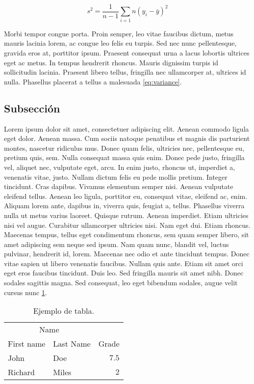 \documentclass[10pt]{article}
\begin{document}
\begin{equation}
   s^2 = \frac{1}{n-1}\sum_{i=1}{n}{(y_i-\bar{y})^2}
   \label{eq:variance}
\end{equation}

Morbi tempor congue porta. Proin semper, leo vitae faucibus dictum, metus mauris lacinia lorem, ac congue leo felis eu turpis. Sed nec nunc pellentesque, gravida eros at, porttitor ipsum. Praesent consequat urna a lacus lobortis ultrices eget ac metus. In tempus hendrerit rhoncus. Mauris dignissim turpis id sollicitudin lacinia. Praesent libero tellus, fringilla nec ullamcorper at, ultrices id nulla. Phasellus placerat a tellus a malesuada \ref{eq:variance}.

\subsection{Subsección}

Lorem ipsum dolor sit amet, consectetuer adipiscing elit. Aenean commodo ligula eget dolor. Aenean massa. Cum sociis natoque penatibus et magnis dis parturient montes, nascetur ridiculus mus. Donec quam felis, ultricies nec, pellentesque eu, pretium quis, sem. Nulla consequat massa quis enim. Donec pede justo, fringilla vel, aliquet nec, vulputate eget, arcu. In enim justo, rhoncus ut, imperdiet a, venenatis vitae, justo. Nullam dictum felis eu pede mollis pretium. Integer tincidunt. Cras dapibus. Vivamus elementum semper nisi. Aenean vulputate eleifend tellus. Aenean leo ligula, porttitor eu, consequat vitae, eleifend ac, enim. Aliquam lorem ante, dapibus in, viverra quis, feugiat a, tellus. Phasellus viverra nulla ut metus varius laoreet. Quisque rutrum. Aenean imperdiet. Etiam ultricies nisi vel augue. Curabitur ullamcorper ultricies nisi. Nam eget dui. Etiam rhoncus. Maecenas tempus, tellus eget condimentum rhoncus, sem quam semper libero, sit amet adipiscing sem neque sed ipsum. Nam quam nunc, blandit vel, luctus pulvinar, hendrerit id, lorem. Maecenas nec odio et ante tincidunt tempus. Donec vitae sapien ut libero venenatis faucibus. Nullam quis ante. Etiam sit amet orci eget eros faucibus tincidunt. Duis leo. Sed fringilla mauris sit amet nibh. Donec sodales sagittis magna. Sed consequat, leo eget bibendum sodales, augue velit cursus nunc \ref{tab:example}.

\begin{table}
   \centering
   \caption{Ejemplo de tabla.}
   \begin{tabular}{llr}
      \toprule
      \multicolumn{2}{c}{Name} \\
      \cmidrule(r){1-2} First name & Last Name & Grade \\ 
      \midrule John & Doe & $7.5$ \\
      Richard & Miles & $2$ \\
      \bottomrule
   \end{tabular}
   \label{tab:example}
\end{table}
\end{document}
